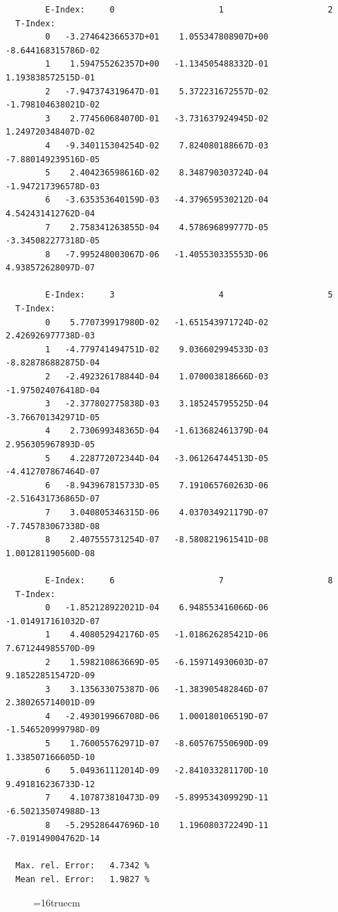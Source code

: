 \documentclass[12pt,dvips]{article}
\begin{document}
\begin{small}\begin{verbatim}
        E-Index:     0                     1                     2
  T-Index:
        0   -3.274642366537D+01    1.055347808907D+00   -8.644168315786D-02
        1    1.594755262357D+00   -1.134505488332D-01    1.193838572515D-01
        2   -7.947374319647D-01    5.372231672557D-02   -1.798104638021D-02
        3    2.774560684070D-01   -3.731637924945D-02    1.249720348407D-02
        4   -9.340115304254D-02    7.824080188667D-03   -7.880149239516D-05
        5    2.404236598616D-02    8.348790303724D-04   -1.947217396578D-03
        6   -3.635353640159D-03   -4.379659530212D-04    4.542431412762D-04
        7    2.758341263855D-04    4.578696899777D-05   -3.345082277318D-05
        8   -7.995248003067D-06   -1.405530335553D-06    4.938572628097D-07

        E-Index:     3                     4                     5
  T-Index:
        0    5.770739917980D-02   -1.651543971724D-02    2.426926977738D-03
        1   -4.779741494751D-02    9.036602994533D-03   -8.828786882875D-04
        2   -2.492326178844D-04    1.070003818666D-03   -1.975024076418D-04
        3   -2.377802775838D-03    3.185245795525D-04   -3.766701342971D-05
        4    2.730699348365D-04   -1.613682461379D-04    2.956305967893D-05
        5    4.228772072344D-04   -3.061264744513D-05   -4.412707867464D-07
        6   -8.943967815733D-05    7.191065760263D-06   -2.516431736865D-07
        7    3.040805346315D-06    4.037034921179D-07   -7.745783067338D-08
        8    2.407555731254D-07   -8.580821961541D-08    1.001281190560D-08

        E-Index:     6                     7                     8
  T-Index:
        0   -1.852128922021D-04    6.948553416066D-06   -1.014917161032D-07
        1    4.408052942176D-05   -1.018626285421D-06    7.671244985570D-09
        2    1.598210863669D-05   -6.159714930603D-07    9.185228515472D-09
        3    3.135633075387D-06   -1.383905482846D-07    2.380265714001D-09
        4   -2.493019966708D-06    1.000180106519D-07   -1.546520999798D-09
        5    1.760055762971D-07   -8.605767550690D-09    1.338507166605D-10
        6    5.049361112014D-09   -2.841033281170D-10    9.491816236733D-12
        7    4.107873810473D-09   -5.899534309929D-11   -6.502135074988D-13
        8   -5.295286447696D-10    1.196080372249D-11   -7.019149004762D-14

  Max. rel. Error:   4.7342 %
  Mean rel. Error:   1.9827 %
\end{verbatim}\end{small}
\begin{figure} \label{7.2.3b}
\epsfxsize=16truecm
\end{figure}
\newpage
\end{document}
